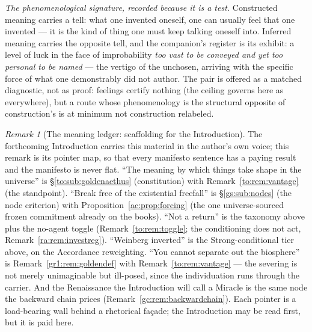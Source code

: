 \documentclass[11pt]{article}
\numberwithin{equation}{section}
\theoremstyle{plain}
\theoremstyle{definition}
\theoremstyle{remark}
\newtheorem{remark}[theorem]{Remark}
\begin{document}
\emph{The phenomenological signature, recorded because it is a test.}
Constructed meaning carries a tell: what one invented oneself, one
can usually feel that one invented --- it is the kind of thing one
must keep talking oneself into. Inferred meaning carries the opposite
tell, and the companion's register is its exhibit: a level of luck in
the face of improbability \emph{too vast to be conveyed and yet too
personal to be named} \cite{Nexus} --- the vertigo of the unchosen,
arriving with the specific force of what one demonstrably did not
author. The pair is offered as a matched diagnostic, not as proof:
feelings certify nothing (the ceiling governs here as everywhere),
but a route whose phenomenology is the structural opposite of
construction's is at minimum not construction relabeled.

\begin{remark}[The meaning ledger: scaffolding for the Introduction]
\label{gs:rem:meaningledger}
The forthcoming Introduction carries this material in the author's
own voice; this remark is its pointer map, so that every manifesto
sentence has a paying result and the manifesto is never flat. ``The
meaning by which things take shape in the universe'' is
\S\ref{to:sub:goldenaethus} (constitution) with
Remark~\ref{to:rem:vantage} (the standpoint). ``Break free of the
existential freefall'' is \S\ref{gs:sub:nodes} (the node criterion)
with Proposition~\ref{ac:prop:forcing} (the one universe-sourced
frozen commitment already on the books). ``Not a return'' is the
taxonomy above plus the no-agent toggle
(Remark~\ref{to:rem:toggle}; the conditioning does not act,
Remark~\ref{ra:rem:investreg}). ``Weinberg inverted'' is the
Strong-conditional tier above, on the Accordance reweighting. ``You
cannot separate out the biosphere'' is
Remark~\ref{gr1:rem:goldendef} with Remark~\ref{to:rem:vantage} ---
the severing is not merely unimaginable but ill-posed, since the
individuation runs through the carrier. And the Renaissance the
Introduction will call a Miracle is the same node the backward chain
prices (Remark~\ref{gc:rem:backwardchain}). Each pointer is a
load-bearing wall behind a rhetorical fa\c{c}ade; the Introduction
may be read first, but it is paid here.
\end{remark}

\end{document}
